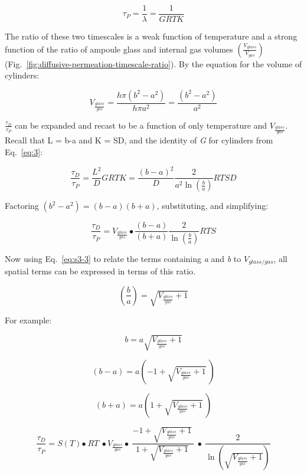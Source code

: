 \begin{equation}
\tau_{P} = \frac{1}{\lambda} = \frac{1}{GRTK}
\label{eq:s3-2}
\end{equation}

The ratio of these two timescales is a weak function of temperature and
a strong function of the ratio of ampoule glass and internal gas volumes
\(\left( \frac{V_{glass}}{V_{gas}} \right)\) (Fig.~\ref{fig:diffusive-permeation-timescale-ratio}). By the
equation for the volume of cylinders:

\begin{equation}
V_{\frac{glass}{gas}} = \frac{h\pi\left( b^{2} - a^{2} \right)}{h\pi a^{2}} = \frac{\left( b^{2} - a^{2} \right)}{a^{2}}
\label{eq:s3-3}
\end{equation}

\(\frac{\tau_{D}}{\tau_{P}}\) can be expanded and recast to be a
function of only temperature and \(V_{\frac{glass}{gas}}\). Recall
that L = b-a and K = SD, and the identity of \emph{G} for cylinders from
Eq.~\eqref{eq:3}:

\[\frac{\tau_{D}}{\tau_{P}} = \frac{L^{2}}{D}GRTK = \frac{(b - a)^{2}}{D}\frac{2}{a^{2}\ln\left( \frac{b}{a} \right)}RTSD\]

Factoring \(\left( b^{2} - a^{2} \right) = (b - a)(b + a)\),
substituting, and simplifying:

\[\frac{\tau_{D}}{\tau_{P}} = V_{\frac{glass}{gas}} \bullet \frac{(b - a)}{(b + a)}\frac{2}{\ln\left( \frac{b}{a} \right)}RTS\]

Now using Eq.~\eqref{eq:s3-3} to relate the terms containing \emph{a} and \emph{b}
to \(V_{glass/gas}\), all spatial terms can be expressed in terms of
this ratio.

\[\left( \frac{b}{a} \right) = \sqrt{V_{\frac{glass}{gas}} + 1}\]

For example:

\[b = a\sqrt{V_{\frac{glass}{gas}} + 1}\]

\[(b - a) = a\left( - 1 + \sqrt{V_{\frac{glass}{gas}} + 1}\  \right)\]

\[(b + a) = a\left( 1 + \sqrt{V_{\frac{glass}{gas}} + 1}\  \right)\]

\begin{equation}
\frac{\tau_{D}}{\tau_{P}} = S(T){\bullet \ RT\  \bullet V}_{\frac{glass}{gas}} \bullet \ \frac{- 1 + \sqrt{V_{\frac{glass}{gas}} + 1}\ }{1 + \sqrt{V_{\frac{glass}{gas}} + 1}\ }\  \bullet \ \frac{2}{\ln\left( \sqrt{V_{\frac{glass}{gas}} + 1} \right)}
\label{eq:s3-4}
\end{equation}

